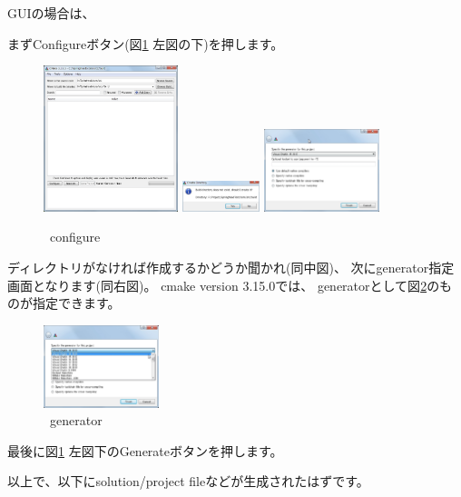 \medskip
\noindent
GUIの場合は、
\begin{narrow}[15pt]
	まずConfigureボタン(図\ref{fig:CmakeConfigure} 左図の下)を押します。
	\begin{figure}[h]
	\begin{center}
	\includegraphics[width=0.35\textwidth]{fig/CmakeConfigure1.eps}
	\includegraphics[width=0.2\textwidth]{fig/CmakeConfigure2.eps}
	\includegraphics[width=0.3\textwidth]{fig/CmakeConfigure3.eps}
	\end{center}
	\caption{\cmake\ configure}
	\label{fig:CmakeConfigure}
	\end{figure}

	\build ディレクトリがなければ作成するかどうか聞かれ(同中図)、
	次にgenerator指定画面となります(同右図)。
	cmake version 3.15.0では、
	generatorとして図\ref{fig:CmakeGenerator}のものが指定できます。

	\begin{figure}[h]
	\begin{center}
	\includegraphics[width=0.3\textwidth]{fig/CmakeConfigure4.eps}
	\end{center}
	\caption{\cmake\ generator}
	\label{fig:CmakeGenerator}
	\end{figure}

	最後に図\ref{fig:CmakeConfigure} 左図下のGenerateボタンを押します。
\end{narrow}

\medskip
\noindent
以上で、\build 以下にsolution/project fileなどが生成されたはずです。

\bigskip

